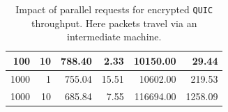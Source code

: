 \documentclass[12pt,a4paper]{report}
\begin{document}
\begin{table}[H]
\begin{tabular}{|r|r|r|r|r|r|}
100                                                                                              & 10                                                                                                                         & 788.40                                                                                                                                          & 2.33                                                                                                                             & 10150.00                                                                                                 & 29.44                                                                                                                            \\ \hline
1000                                                                                             & 1                                                                                                                          & 755.04                                                                                                                                          & 15.51                                                                                                                            & 10602.00                                                                                                 & 219.53                                                                                                                           \\ \hline
1000                                                                                             & 10                                                                                                                         & 685.84                                                                                                                                          & 7.55                                                                                                                             & 116694.00                                                                                                & 1258.09                                                                                                                          \\ \hline
\end{tabular}
    \centering
    \caption{Impact of parallel requests for encrypted \texttt{QUIC} throughput. Here packets travel via an intermediate machine.}
    \label{fig:QUIC_throughput_via_B_using_parallel_requests}
\end{table}
\end{document}
